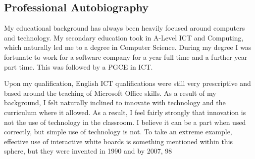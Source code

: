 \subsection{Professional Autobiography}
My educational background has always been heavily focused around computers and technology. My secondary education took in A-Level ICT and Computing, which naturally led me to a degree in Computer Science. During my degree I was fortunate to work for a software company for a year full time and a further year part time. This was followed by a PGCE in ICT.

Upon my qualification, English ICT qualifications were still very prescriptive and based around the teaching of Microsoft Office skills. As a result of my background, I felt naturally inclined to innovate with technology and the curriculum where it allowed. As a result, I feel fairly strongly that innovation is not the use of technology in the classroom. I believe it can be a part when used correctly, but simple use of technology is not. To take an extreme example, effective use of interactive white boards is something mentioned within this sphere, but they were invented in 1990 and by 2007, 98%

